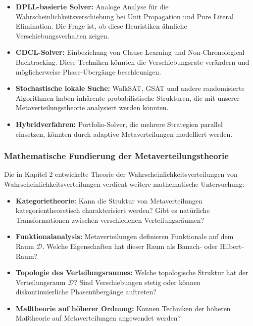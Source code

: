 ﻿\documentclass[a4paper,12pt]{article}
\theoremstyle{definition}
\begin{document}
\begin{itemize}
	\item \textbf{DPLL-basierte Solver:} Analoge Analyse für die Wahrscheinlichkeitsverschiebung bei Unit Propagation und Pure Literal Elimination. Die Frage ist, ob diese Heuristiken ähnliche Verschiebungsverhalten zeigen.
	
	\item \textbf{CDCL-Solver:} Einbeziehung von Clause Learning und Non-Chronological Backtracking. Diese Techniken könnten die Verschiebungsrate verändern und möglicherweise Phase-Übergänge beschleunigen.
	
	\item \textbf{Stochastische lokale Suche:} WalkSAT, GSAT und andere randomisierte Algorithmen haben inhärente probabilistische Strukturen, die mit unserer Metaverteilungstheorie analysiert werden könnten.
	
	\item \textbf{Hybridverfahren:} Portfolio-Solver, die mehrere Strategien parallel einsetzen, könnten durch adaptive Metaverteilungen modelliert werden.
\end{itemize}

\subsubsection{Mathematische Fundierung der Metaverteilungstheorie}

Die in Kapitel 2 entwickelte Theorie der Wahrscheinlichkeitsverteilungen von Wahrscheinlichkeitsverteilungen verdient weitere mathematische Untersuchung:

\begin{itemize}
	\item \textbf{Kategorietheorie:} Kann die Struktur von Metaverteilungen kategorientheoretisch charakterisiert werden? Gibt es natürliche Transformationen zwischen verschiedenen Verteilungsräumen?
	
	\item \textbf{Funktionalanalysis:} Metaverteilungen definieren Funktionale auf dem Raum $\mathcal{D}$. Welche Eigenschaften hat dieser Raum als Banach- oder Hilbert-Raum?
	
	\item \textbf{Topologie des Verteilungsraumes:} Welche topologische Struktur hat der Verteilungsraum $\mathcal{D}$? Sind Verschiebungen stetig oder können diskontinuierliche Phasenübergänge auftreten?
	
	\item \textbf{Maßtheorie auf höherer Ordnung:} Können Techniken der höheren Maßtheorie auf Metaverteilungen angewendet werden?
\end{itemize}
\end{document}
